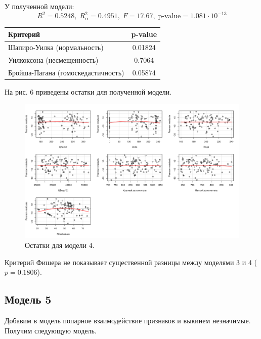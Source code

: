\documentclass[10pt]{article}
\begin{document}
У полученной модели:
$$
  R^2 = 0.5248, \; R^2_{\alpha} = 0.4951, \; F = 17.67, \; \text{p-value} = 1.081 \cdot 10^{-13}
$$

\begin{tabularx}{\textwidth}{ |X|c| }
  \hline
  Критерий & p-value \\
  \hline
  Шапиро-Уилка (нормальность) & 0.01824 \\
  \hline
  Уилкоксона (несмещенность) & 0.7064 \\
  \hline
  Бройша-Пагана (гомоскедастичность) & 0.05874 \\
  \hline
\end{tabularx}

\bigskip

На рис. 6 приведены остатки для полученной модели.

\begin{figure}[h]
  \centering
  \includegraphics[scale=0.4]{resplots_4.png}
  \caption{Остатки для модели 4.}
\end{figure}

Критерий Фишера не показывает существенной разницы между моделями 3 и 4 ($p=0.1806$).

\subsection{Модель 5}

Добавим в модель попарное взаимодействие признаков и выкинем незначимые.
Получим следующую модель.
\end{document}
